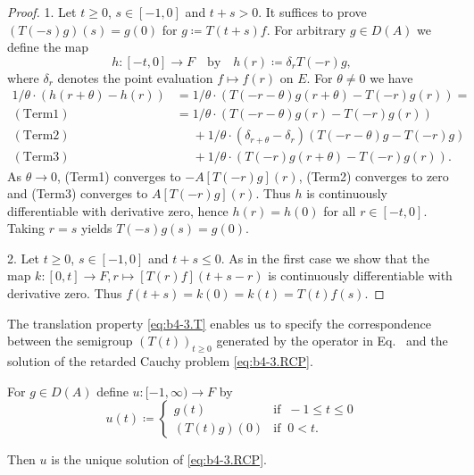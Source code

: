 \begin{proof}
1. Let $t \geq 0$, $s \in [-1,0]$ and $t+s  >  0$.
It suffices to prove $(T(-s)g)(s) = g(0)$ for $g  \coloneq  T(t+s)f$.
For arbitrary $g \in D(A)$ we define the map
\[
h \colon [-t,0] \to F \quad \text{by} \quad h(r) \coloneq  \delta_{r}T(-r)g ,
\]
where $\delta_{r}$ denotes the point evaluation $f \mapsto f(r)$ on $E$.
For $\theta \neq 0$ we have
\begin{align*}
	1/\theta\cdot(h(r+\theta) - h(r)) & = 1/\theta\cdot(T(-r-\theta)g(r+\theta) - T(-r)g(r)) =\\
	(\mathrm{Term1})\quad  &= 1/\theta\cdot(T(-r-\theta)g(r) - T(-r)g(r)) \\
	(\mathrm{Term2})\quad  &\phantom{= }  + 1/\theta\cdot(\delta_{r+\theta} - \delta_{r})(T(-r-\theta)g - T(-r)g) \\
	(\mathrm{Term3})\quad &\phantom{= }  + 1/\theta\cdot(T(-r)g(r+\theta) - T(-r)g(r)).
\end{align*}
As $\theta \to 0$, (Term1) converges to $-A[T(-r)g](r)$, (Term2) converges to zero and (Term3) converges to $A[T(-r)g](r)$.
Thus $h$ is continuously differentiable with derivative zero, hence $h(r) = h(0)$ for all $r \in [-t,0]$.
Taking $r = s$ yields $T(-s)g(s) = g(0)$.

2. Let $t \geq 0$, $s \in [-1,0]$ and $t+s \leq 0$.
As in the first case we show that the map $k \colon [0,t] \to F , r \mapsto [T(r)f](t+s-r)$ is continuously differentiable with derivative zero.
Thus $f(t+s) = k(0) = k(t) = T(t)f(s)$.
\end{proof}
The translation property \eqref{eq:b4-3.T} enables us to specify the correspondence between the semigroup $(T(t))_{t\geq 0}$ generated by the operator in Eq.~ and the solution of the retarded Cauchy problem \eqref{eq:b4-3.RCP}.
\begin{corollary}\label{cor:b4-3.2}
	For $g \in D(A)$ define $u \colon [-1,\infty) \to F$ by
	\[u(t)  \coloneq  \begin{cases}
		g(t) & \text{if } \ -1 \leq t \leq 0 \\
		(T(t)g)(0) & \text{if } \ 0 < t.
	\end{cases}\]
	
	Then $u$ is the unique solution of \eqref{eq:b4-3.RCP}.
\end{corollary}
